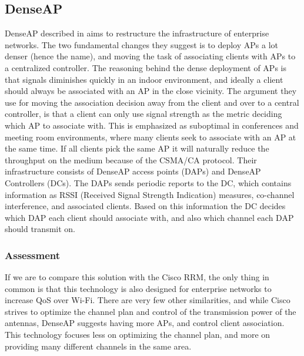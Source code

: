 \subsection{DenseAP}
DenseAP described in \cite{Murty2} aims to restructure the infrastructure of enterprise networks.  The two fundamental
changes they suggest is to deploy APs a lot denser (hence the name), and moving the task of associating clients
with APs to a centralized controller. The reasoning behind the dense deployment of APs is that signals diminishes
quickly in an indoor environment, and ideally a client should always be associated with an AP in the close vicinity. The argument 
they use for moving the association decision away from the client and over to a central controller, is that a client can
only use signal strength as the metric deciding which AP to associate with. This is emphasized as
suboptimal in conferences and meeting room environments, where many clients seek to associate with an AP at the same time.
If all clients pick the same AP it will naturally reduce the throughput on the medium because of the CSMA/CA protocol. 
Their infrastructure consists of DenseAP access points (DAPs) and DenseAP Controllers (DCs). The DAPs sends periodic
reports to the DC, which contains information as RSSI (Received Signal Strength Indication) measures, co-channel interference, and associated clients. Based on this
information the DC decides which DAP each client should associate with, and also which channel each DAP should transmit
on. 

\subsubsection{Assessment}
If we are to compare this solution with the Cisco RRM, the only thing in common is that this technology is also designed for enterprise networks to increase QoS over Wi-Fi. There
are very few other similarities, and while Cisco strives to optimize the channel plan and control of the transmission power of the antennas, DenseAP suggests having more APs, and control client association. This technology focuses less on optimizing the channel plan, and more on providing many different channels in the same area.  


